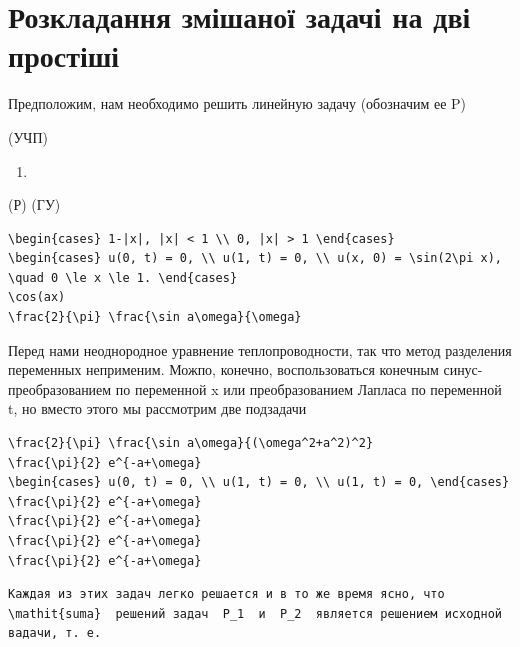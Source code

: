 \documentclass[
  ukrainian,
]{article}
\providecommand{\tightlist}{%
  \setlength{\itemsep}{0pt}\setlength{\parskip}{0pt}}
\begin{document}
\section{Розкладання змішаної задачі на дві
простіші}\label{ux440ux43eux437ux43aux43bux430ux434ux430ux43dux43dux44f-ux437ux43cux456ux448ux430ux43dux43eux457-ux437ux430ux434ux430ux447ux456-ux43dux430-ux434ux432ux456-ux43fux440ux43eux441ux442ux456ux448ux456}

Предположим, нам необходимо решить линейную задачу (обозначим ее P)

(УЧП)

\begin{enumerate}
\def\labelenumi{\arabic{enumi}.}
\setcounter{enumi}{17}
\tightlist
\item
\end{enumerate}

(Р) (ГУ)

\begin{verbatim}
\begin{cases} 1-|x|, |x| < 1 \\ 0, |x| > 1 \end{cases}
\begin{cases} u(0, t) = 0, \\ u(1, t) = 0, \\ u(x, 0) = \sin(2\pi x), \quad 0 \le x \le 1. \end{cases}
\cos(ax)
\frac{2}{\pi} \frac{\sin a\omega}{\omega}
\end{verbatim}

Перед нами неоднородное уравнение теплопроводности, так что метод
разделения переменных неприменим. Можпо, конечно, воспользоваться
конечным синус-преобразованием по переменной x или преобразованием
Лапласа по переменной t, но вместо этого мы рассмотрим две подзадачи

\begin{verbatim}
\frac{2}{\pi} \frac{\sin a\omega}{(\omega^2+a^2)^2}
\frac{\pi}{2} e^{-a+\omega}
\begin{cases} u(0, t) = 0, \\ u(1, t) = 0, \\ u(1, t) = 0, \end{cases}
\frac{\pi}{2} e^{-a+\omega}
\frac{\pi}{2} e^{-a+\omega}
\frac{\pi}{2} e^{-a+\omega}
\frac{\pi}{2} e^{-a+\omega}
\end{verbatim}

\begin{verbatim}
Каждая из этих задач легко решается и в то же время ясно, что  \mathit{suma}  решений задач  P_1  и  P_2  является решением исходной вадачи, т. е.
\end{verbatim}
\end{document}
